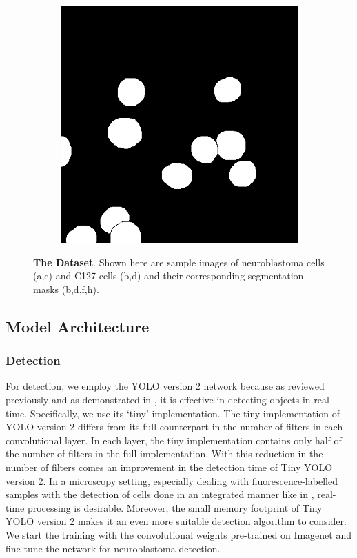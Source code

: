 \documentclass[journal]{IEEEtran}
\begin{document}
\begin{figure}
\begin{subfigure}[b]{0.24\linewidth}
\caption{}
\end{subfigure}
\begin{subfigure}[b]{0.24\linewidth}
\includegraphics[width=\linewidth]{c127/108641-label.jpg}
\caption{}
\end{subfigure}
\caption{\textbf{The Dataset}. Shown here are sample images of neuroblastoma cells (a,c) and C127 cells (b,d) and their corresponding segmentation masks (b,d,f,h). }
\end{figure}
\subsection{Model Architecture}
\subsubsection{Detection}
For detection, we employ the YOLO version 2 network because as reviewed previously and as demonstrated in \cite{Waithe544833}, it is effective in detecting objects in real-time. Specifically, we use its `tiny' implementation. The tiny implementation of YOLO version 2 differs from its full counterpart in the number of filters in each convolutional layer. In each layer, the tiny implementation contains only half of the number of filters in the full implementation. With this reduction in the number of filters comes an improvement in the detection time of Tiny YOLO version 2. In a microscopy setting, especially dealing with fluorescence-labelled samples with the detection of cells done in an integrated manner like in \cite{Waithe544833}, real-time processing is desirable. Moreover, the small memory footprint of Tiny YOLO version 2 makes it an even more suitable detection algorithm to consider. We start the training with the convolutional weights pre-trained on Imagenet and fine-tune the network for neuroblastoma detection.
\end{document}
